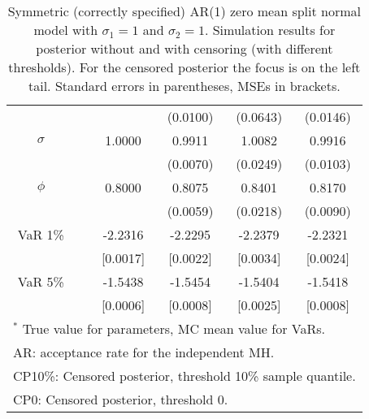 {\begin{table}
\begin{tabular}{cc cccc}
&&   & (0.0100) & (0.0643) & (0.0146)  \\ 
$\sigma$&& 1.0000 & 0.9911 & 1.0082 & 0.9916  \\ 
&&   & (0.0070) & (0.0249) & (0.0103)  \\ 
$\phi$&& 0.8000 & 0.8075 & 0.8401 & 0.8170  \\ 
&&   & (0.0059) & (0.0218) & (0.0090)  \\ 
VaR 1\% && -2.2316 & -2.2295 & -2.2379 & -2.2321  \\ 
  && [0.0017] & [0.0022] & [0.0034] & [0.0024]  \\ 
VaR 5\% && -1.5438 & -1.5454 & -1.5404 & -1.5418  \\ 
 && [0.0006] & [0.0008] & [0.0025] & [0.0008]  \\ 
\hline 
\multicolumn{6}{l}{\footnotesize{$^*$ True value for parameters, MC mean value for VaRs.}}  \\ 
\multicolumn{6}{l}{\footnotesize{AR: acceptance rate for the independent MH.}}  \\ 
\multicolumn{6}{l}{\footnotesize{CP10\%: Censored posterior, threshold 10\% sample quantile.}}  \\ 
\multicolumn{6}{l}{\footnotesize{CP0: Censored posterior, threshold 0.}} 
\end{tabular}
 \caption{Symmetric (correctly specified) AR(1) zero mean split normal model with $\sigma_{1} = 1$ and $\sigma_{2} = 1$. Simulation results for posterior without and with censoring (with different thresholds). For the censored posterior the focus is on the left tail. Standard errors in parentheses, MSEs in brackets.} 
\label{tab:ar1_s1}  
\end{table}
}